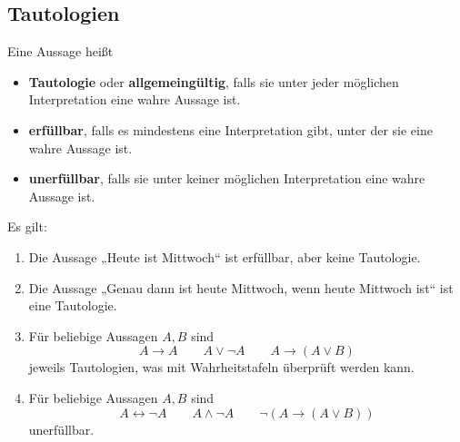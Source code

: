 \subsection*{Tautologien}


\begin{defin} 
    Eine Aussage heißt
    \begin{itemize}
        \item \textbf{Tautologie} oder \textbf{allgemeingültig}, falls sie unter jeder möglichen Interpretation eine wahre Aussage ist.
        \item \textbf{erfüllbar}, falls es mindestens eine Interpretation gibt, unter der sie eine wahre Aussage ist.
        \item \textbf{unerfüllbar}, falls sie unter keiner möglichen Interpretation eine wahre Aussage ist.
    \end{itemize}
\end{defin}


\begin{bsp}
    Es gilt:
    \begin{enumerate}
        \item Die Aussage „Heute ist Mittwoch“ ist erfüllbar, aber keine Tautologie.
        \item Die Aussage „Genau dann ist heute Mittwoch, wenn heute Mittwoch ist“ ist eine Tautologie.
        \item Für beliebige Aussagen $A,B$ sind
            \[ A \to A \qquad A\lor \neg A  \qquad A \to (A\lor B) \]
        jeweils Tautologien, was mit Wahrheitstafeln überprüft werden kann.%
        \item Für beliebige Aussagen $A,B$ sind
            \[ A \leftrightarrow \neg A \qquad A\land \neg A \qquad  \neg(A\to (A\lor B))\]
        unerfüllbar.
    \end{enumerate}
\end{bsp}
 
